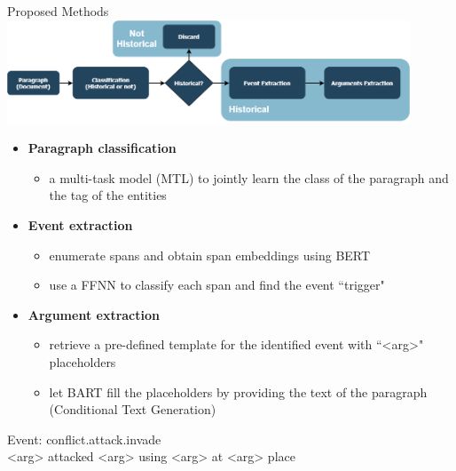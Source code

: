 \documentclass[10pt,aspectratio=1610,professionalfont]{beamer}
\begin{document}
\begin{frame}{Proposed Methods}
\center
    \includegraphics[width=0.9\textwidth]{img/event_strategy.png}
    \vspace{-10pt}
    \begin{itemize}
        \item \textbf{Paragraph classification} 
        \begin{itemize}
            \item a multi-task model (MTL) to jointly learn the class of the paragraph and the tag of the entities
        \end{itemize} 
        \item \textbf{Event extraction}
        \begin{itemize}
            \item enumerate spans and obtain span embeddings using BERT
            \item use a FFNN to classify each span and find the event “trigger"
        \end{itemize}  
        \item \textbf{Argument extraction}
        \begin{itemize}
            \item retrieve a pre-defined template for the identified event with “<arg>" placeholders
            \item let BART fill the placeholders by providing the text of the paragraph (Conditional Text Generation)
        \end{itemize} 
    \end{itemize}
\end{frame}

\begin{frame}[standout]
    Event: conflict.attack.invade \\
    \vspace{10pt}
    <arg> attacked <arg> using <arg> at <arg> place
\end{frame}
\end{document}
